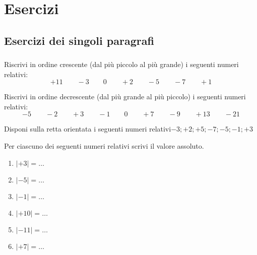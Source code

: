 
\section{Esercizi}

\subsection{Esercizi dei singoli paragrafi}

\subsubsection*{}


\begin{esercizio}
 \label{ese:2.1}
Riscrivi in ordine crescente (dal più piccolo al più grande) i seguenti numeri 
relativi:
\[+11\qquad-3\qquad0\qquad+2\qquad-5\qquad-7\qquad+1\]
\end{esercizio}

\begin{esercizio}
 \label{ese:2.2}
Riscrivi in ordine decrescente (dal più grande al più piccolo) i seguenti numeri 
relativi:
\[-5\qquad-2\qquad+3\qquad-1\qquad0\qquad+7\qquad-9\qquad+13\qquad-21\]
\end{esercizio}

\begin{esercizio}
 \label{ese:2.3}
Disponi sulla retta orientata i seguenti numeri relativi\(-3; +2; +5; -7; -5; -1; 
+3\)
\begin{center}
\esec
%  
\end{center}

\end{esercizio}

\begin{esercizio}
 \label{ese:2.4}
Per ciascuno dei seguenti numeri relativi scrivi il valore assoluto.
\begin{multicols}{3}
\begin{enumerate}[noitemsep, label=(\alph*)]
 \item \(|+3|=\ldots\)
 \item \(|-5|=\ldots\)
 \item \(|-1|=\ldots\)
 \item \(|+10|=\ldots\)
 \item \(|-11|=\ldots\)
 \item \(|+7|=\ldots\)
\end{enumerate}
\end{multicols}
\end{esercizio}

